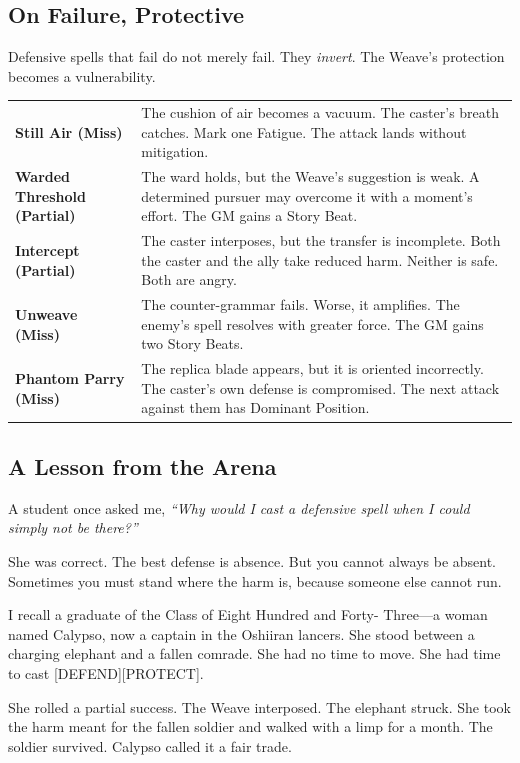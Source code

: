 \subsection{On Failure, Protective}

Defensive spells that fail do not merely fail. They \emph{invert}. The Weave's protection becomes a vulnerability.

\begin{tabular}{p{} p{}}
\textbf{Still Air (Miss)} & The cushion of air becomes a vacuum. The caster's breath catches. Mark one Fatigue. The attack lands without mitigation. \\
\textbf{Warded Threshold (Partial)} & The ward holds, but the Weave's suggestion is weak. A determined pursuer may overcome it with a moment's effort. The GM gains a Story Beat. \\
\textbf{Intercept (Partial)} & The caster interposes, but the transfer is incomplete. Both the caster and the ally take reduced harm. Neither is safe. Both are angry. \\
\textbf{Unweave (Miss)} & The counter-grammar fails. Worse, it amplifies. The enemy's spell resolves with greater force. The GM gains two Story Beats. \\
\textbf{Phantom Parry (Miss)} & The replica blade appears, but it is oriented incorrectly. The caster's own defense is compromised. The next attack against them has Dominant Position. \\
\end{tabular}

\subsection{A Lesson from the Arena}

A student once asked me, \emph{``Why would I cast a defensive spell when I could simply not be there?''}

She was correct. The best defense is absence. But you cannot always be absent. Sometimes you must stand where the harm is, because someone else cannot run.

I recall a graduate of the Class of Eight Hundred and Forty- Three---a woman named Calypso, now a captain in the Oshiiran lancers. She stood between a charging elephant and a fallen comrade. She had no time to move. She had time to cast [DEFEND][PROTECT].

She rolled a partial success. The Weave interposed. The elephant struck. She took the harm meant for the fallen soldier and walked with a limp for a month. The soldier survived. Calypso called it a fair trade.


